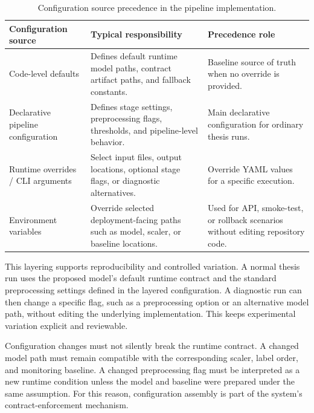 \renewcommand{\arraystretch}{1.15}
\begin{table}[htbp]
\centering
\footnotesize
\caption[Configuration source precedence in the pipeline implementation.]{Configuration source precedence in the pipeline implementation.}
\label{tab:configuration_precedence}
\begin{tabularx}{\textwidth}{p{3.0cm} X X}
\toprule
\textbf{Configuration source} & \textbf{Typical responsibility} & \textbf{Precedence role} \\
\midrule
Code-level defaults
& Defines default runtime model paths, contract artifact paths, and fallback constants.
& Baseline source of truth when no override is provided. \\

Declarative pipeline configuration
& Defines stage settings, preprocessing flags, thresholds, and pipeline-level behavior.
& Main declarative configuration for ordinary thesis runs. \\

Runtime overrides / CLI arguments
& Select input files, output locations, optional stage flags, or diagnostic alternatives.
& Override YAML values for a specific execution. \\

Environment variables
& Override selected deployment-facing paths such as model, scaler, or baseline locations.
& Used for API, smoke-test, or rollback scenarios without editing repository code. \\
\bottomrule
\end{tabularx}
\renewcommand{\arraystretch}{1.0}
\end{table}

This layering supports reproducibility and controlled variation. A normal thesis run uses the proposed model's default runtime contract and the standard preprocessing settings defined in the layered configuration. A diagnostic run can then change a specific flag, such as a preprocessing option or an alternative model path, without editing the underlying implementation. This keeps experimental variation explicit and reviewable.

Configuration changes must not silently break the runtime contract. A changed model path must remain compatible with the corresponding scaler, label order, and monitoring baseline. A changed preprocessing flag must be interpreted as a new runtime condition unless the model and baseline were prepared under the same assumption. For this reason, configuration assembly is part of the system's contract-enforcement mechanism.

